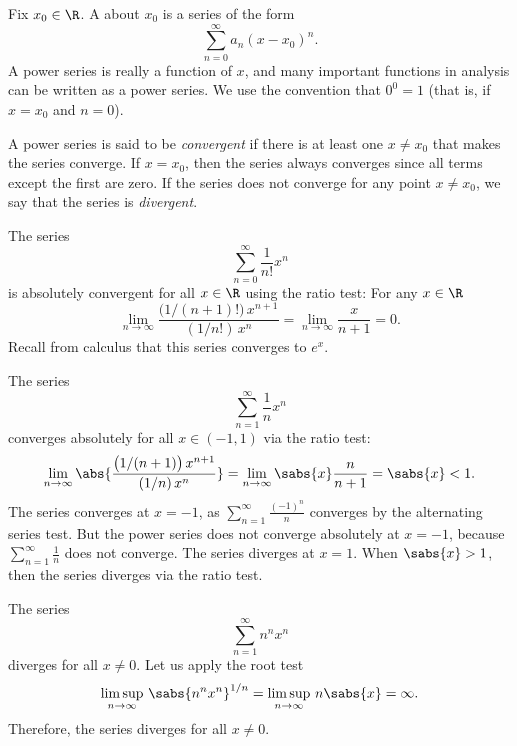 Fix $x_0 \in \R$.
A \emph{} about $x_0$
is a series of the form
\begin{equation*}
\sum_{n=0}^\infty a_n {(x-x_0)}^n .
\end{equation*}
A power series is really a function of $x$, and
many important functions in analysis can be written
as a power series.  We use the convention that
$0^0 = 1$ (that is, if $x=x_0$ and $n=0$).

A power series is said to be
\emph{convergent} if
there is at least one $x \not= x_0$ that makes the series converge.
If $x=x_0$, then the series always
converges since all terms except the first are zero.
If the series does not converge for any point $x \not= x_0$, we say that
the series is \emph{divergent}.

\begin{example} \label{ps:expex}
The series
\begin{equation*}
\sum_{n=0}^\infty \frac{1}{n!} x^n
\end{equation*}
is absolutely convergent for all $x \in \R$ using the ratio test:
For any $x \in \R$
\begin{equation*}
\lim_{n \to \infty}
\frac{\bigl(1/(n+1)!\bigr) \, x^{n+1}}{(1/n!) \, x^{n}}
=
\lim_{n \to \infty}
\frac{x}{n+1}
=
0.
\end{equation*}
Recall from calculus that this series converges to $e^x$.
\end{example}

\begin{example} \label{ps:1kex}
The series
\begin{equation*}
\sum_{n=1}^\infty \frac{1}{n} x^n
\end{equation*}
converges absolutely for all $x \in (-1,1)$ via the ratio test:
\begin{equation*}
\lim_{n \to \infty}
\abs{
\frac{\bigl(1/(n+1) \bigr) \, x^{n+1}}{(1/n) \, x^{n}}
}
=
\lim_{n \to \infty}
\sabs{x} \frac{n}{n+1}
=
\sabs{x} < 1 .
\end{equation*}
The series converges at $x=-1$,
as
$\sum_{n=1}^\infty \frac{{(-1)}^n}{n}$ converges
by the alternating series
test.
But the power series does not converge absolutely at $x=-1$, because
$\sum_{n=1}^\infty \frac{1}{n}$ does not converge.
The series
diverges at $x=1$.
When $\sabs{x} > 1$, then the series diverges via the ratio test.
\end{example}

\begin{example} \label{ps:divergeex}
The series
\begin{equation*}
\sum_{n=1}^\infty n^n x^n
\end{equation*}
diverges for all $x \not= 0$.  Let us apply the root test
\begin{equation*}
\limsup_{n\to\infty}
\,
\sabs{n^n x^n}^{1/n}
=
\limsup_{n\to\infty}
\,
n \sabs{x}
= \infty .
\end{equation*}
Therefore, the series diverges for all $x \not= 0$.
\end{example}

